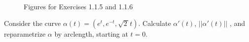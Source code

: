 \documentclass[Shifrin_Solutions_Spring_2015]{subfiles}
\begin{document}
\begin{figure}[h]
\centering
{}
  \caption{Figures for Exercises 1.1.5 and 1.1.6}
\end{figure}





\begin{exercise}
Consider the curve $\alpha(t) = \left( e^t , e^{-t} , \sqrt{2\,} t \right)$. Calculate $\alpha'(t)$, $||\alpha'(t)||$ , and reparametrize $\alpha$ by arclength, starting at $t=0$.
\end{exercise}
\end{document}
